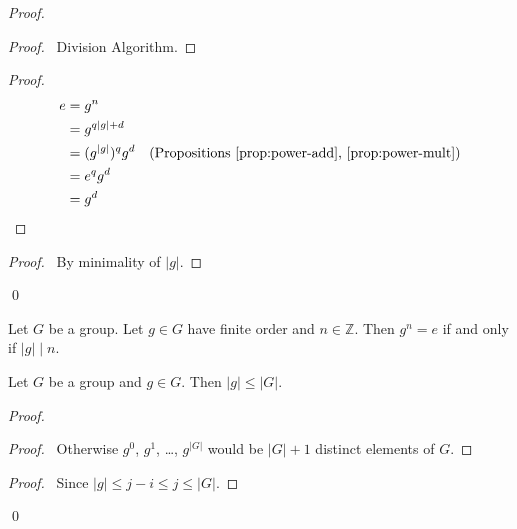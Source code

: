 \begin{proof}
    \pf
    \begin{proof}
        \pf\ Division Algorithm.
    \end{proof}
    \begin{proof}
        \pf
        \begin{align*}
            e & = g^n                                                                                 \\
              & = g^{q|g| + d}                                                                        \\
              & = (g^{|g|})^q g^d & (\text{Propositions \ref{prop:power-add}, \ref{prop:power-mult}}) \\
              & = e^q g^d                                                                             \\
              & = g^d
        \end{align*}
    \end{proof}
    \begin{proof}
        \pf\ By minimality of $|g|$.
    \end{proof}
    \qed
\end{proof}

\begin{cor}
    \label{cor:order-divides}
    Let $G$ be a group. Let $g \in G$ have finite order and $n \in \mathbb{Z}$. Then $g^n = e$ if and only if $|g| \mid n$.
\end{cor}

\begin{prop}
    Let $G$ be a group and $g \in G$. Then $|g| \leq |G|$.
\end{prop}

\begin{proof}
    \pf
    \begin{proof}
        \pf\ Otherwise $g^0$, $g^1$, \ldots, $g^{|G|}$ would be $|G| + 1$ distinct elements of $G$.
    \end{proof}
    \begin{proof}
        \pf\ Since $|g| \leq j - i \leq j \leq |G|$.
    \end{proof}
    \qed
\end{proof}

